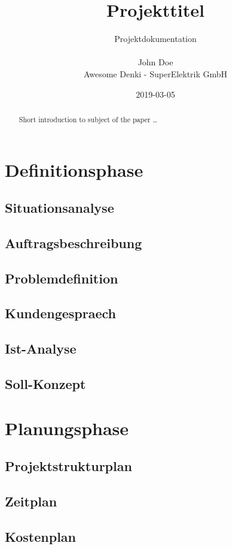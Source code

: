 \documentclass[11pt, a4paper]{article}
\title{Projekttitel}
\date{2019-03-05}
\author{Projektdokumentation\\
       \\
       John Doe\\
       Awesome Denki - SuperElektrik GmbH\\
}
\begin{document}
  \maketitle
  \newpage

  \tableofcontents
  \newpage


  \section{Definitionsphase}
    \begin{abstract}
    Short introduction to subject of the paper \ldots
    \end{abstract}
    \subsection{Situationsanalyse}
    \subsection{Auftragsbeschreibung}
    \subsection{Problemdefinition}
    \subsection{Kundengespraech}
    \subsection{Ist-Analyse}
    \subsection{Soll-Konzept}
    \newpage

  \section{Planungsphase}
    \subsection{Projektstrukturplan}
    \subsection{Zeitplan}
    \subsection{Kostenplan}
\end{document}
